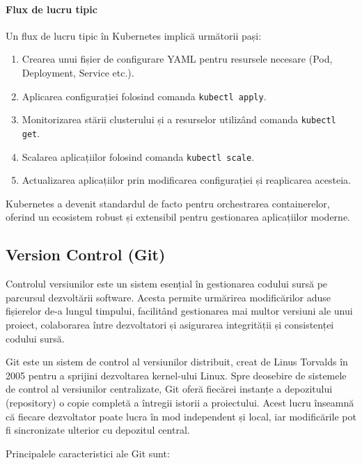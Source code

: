 \documentclass[titlepage,12pt]{article}
\begin{document}
\paragraph{Flux de lucru tipic}
Un flux de lucru tipic în Kubernetes implică următorii pași:
\begin{enumerate}
\item Crearea unui fișier de configurare YAML pentru resursele necesare (Pod, Deployment, Service etc.).
\item Aplicarea configurației folosind comanda \texttt{kubectl apply}.
\item Monitorizarea stării clusterului și a resurselor utilizând comanda \texttt{kubectl get}.
\item Scalarea aplicațiilor folosind comanda \texttt{kubectl scale}.
\item Actualizarea aplicațiilor prin modificarea configurației și reaplicarea acesteia.
\end{enumerate}

Kubernetes a devenit standardul de facto pentru orchestrarea containerelor, oferind un ecosistem robust și extensibil pentru gestionarea aplicațiilor moderne.

\subsection{Version Control (Git)}

Controlul versiunilor este un sistem esențial în gestionarea codului sursă pe parcursul dezvoltării software. Acesta permite urmărirea modificărilor aduse fișierelor de-a lungul timpului, facilitând gestionarea mai multor versiuni ale unui proiect, colaborarea între dezvoltatori și asigurarea integrității și consistenței codului sursă.

Git este un sistem de control al versiunilor distribuit, creat de Linus Torvalds în 2005 pentru a sprijini dezvoltarea kernel-ului Linux. Spre deosebire de sistemele de control al versiunilor centralizate, Git oferă fiecărei instanțe a depozitului (repository) o copie completă a întregii istorii a proiectului. Acest lucru înseamnă că fiecare dezvoltator poate lucra în mod independent și local, iar modificările pot fi sincronizate ulterior cu depozitul central.

Principalele caracteristici ale Git sunt:
\end{document}
